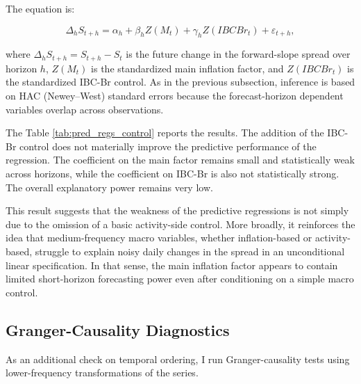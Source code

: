 \documentclass[11pt]{article}
\begin{document}
	The equation is:
	
	\[
	\Delta_h S_{t+h} = \alpha_h + \beta_h Z(M_t) + \gamma_h Z(IBCBr_t) + \varepsilon_{t+h},
	\]
	
	where \(\Delta_h S_{t+h} = S_{t+h} - S_t\) is the future change in the forward-slope spread over horizon \(h\), \(Z(M_t)\) is the standardized main inflation factor, and \(Z(IBCBr_t)\) is the standardized IBC-Br control. As in the previous subsection, inference is based on HAC (Newey--West) standard errors because the forecast-horizon dependent variables overlap across observations.
	
	\begin{table}[H]
		\centering
		\footnotesize
		\resizebox{\textwidth}{!}{
			
		}
		\caption{Predictive regressions including an activity-side control.}
		\label{tab:pred_regs_control}
	\end{table}
	
	The Table \ref{tab:pred_regs_control} reports the results. The addition of the IBC-Br control does not materially improve the predictive performance of the regression. The coefficient on the main factor remains small and statistically weak across horizons, while the coefficient on IBC-Br is also not statistically strong. The overall explanatory power remains very low.
	
	This result suggests that the weakness of the predictive regressions is not simply due to the omission of a basic activity-side control. More broadly, it reinforces the idea that medium-frequency macro variables, whether inflation-based or activity-based, struggle to explain noisy daily changes in the spread in an unconditional linear specification. In that sense, the main inflation factor appears to contain limited short-horizon forecasting power even after conditioning on a simple macro control.
	

	
	\subsection{Granger-Causality Diagnostics}
	\label{subsec:granger_diagnostics}
	
	As an additional check on temporal ordering, I run Granger-causality tests using lower-frequency transformations of the series.
	
	\begin{table}[H]
		\centering
		\footnotesize
		\resizebox{\textwidth}{!}{
			
		}
		\caption{Weekly Granger-causality diagnostics for the inflation-based macro factors.}
		\label{tab:granger}
	\end{table}
	
\end{document}
